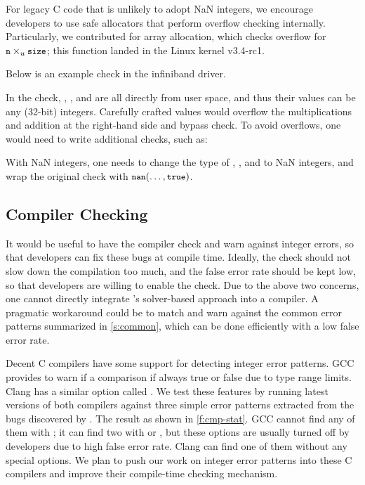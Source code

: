 For legacy C code that is unlikely to adopt NaN integers, we encourage
developers to use safe allocators that perform overflow checking
internally.  Particularly, we contributed  for array allocation, which checks overflow for $\cc{n}
\times_u \cc{size}$; this function landed in the Linux kernel v3.4-rc1.

Below is an example check in the infiniband driver.

In the check, , , and  are
all directly from user space, and thus their values can be any
(32-bit) integers.  Carefully crafted values would overflow the
multiplications and addition at the right-hand side and bypass
check.  To avoid overflows, one would need to write additional
checks, such as:

With NaN integers, one needs to change the type of
, , and  to NaN integers,
and wrap the original check with $\cc{nan}(\dots, \cc{true})$.

\fi


\subsection{Compiler Checking}

It would be useful to have the compiler check and warn against
integer errors, so that developers can fix these bugs
at compile time.  Ideally, the check should not slow down
the compilation too much, and the false error rate should be kept low,
so that developers are willing to enable the check.
%
Due to the above two concerns, one cannot directly integrate
\sys's solver-based approach into a compiler.  A pragmatic workaround
could be to match and warn against the common error patterns
summarized in \autoref{s:common}, which can be done efficiently
with a low false error rate.

Decent C compilers have some support for detecting integer error
patterns.
%
GCC provides  to warn if a comparison if always
true or false due to type range limits.
%
Clang has a similar option called .
%
We test these features by running latest versions of both compilers
against three simple error patterns extracted from the bugs discovered
by \sys.  The result as shown in \autoref{f:cmp-stat}.  GCC cannot
find any of them with ; it can find two with 
or , but these options are usually turned off by
developers due to high false error rate.  Clang can find one of them
without any special options.
%
%
We plan to push our work on integer error patterns into these C
compilers and improve their compile-time checking mechanism.

